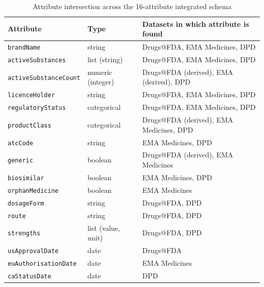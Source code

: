 \documentclass{llncs}
\begin{document}
\begin{table}[htbp]
\centering
\caption{Attribute intersection across the 16-attribute integrated schema}
\label{tab:schema}
\scriptsize
\setlength{\tabcolsep}{3pt}
\begin{tabularx}{\textwidth}{|l|l|>{\raggedright\arraybackslash}X|}
\hline
\textbf{Attribute} & \textbf{Type} & \textbf{Datasets in which attribute is found} \\
\hline
\texttt{brandName}            & string             & Drugs@FDA, EMA Medicines, DPD \\
\texttt{activeSubstances}     & list (string)      & Drugs@FDA, EMA Medicines, DPD \\
\texttt{activeSubstanceCount} & numeric (integer)  & Drugs@FDA (derived), EMA (derived), DPD \\
\texttt{licenceHolder}        & string             & Drugs@FDA, EMA Medicines, DPD \\
\texttt{regulatoryStatus}     & categorical        & Drugs@FDA, EMA Medicines, DPD \\
\texttt{productClass}         & categorical        & Drugs@FDA (derived), EMA Medicines, DPD \\
\texttt{atcCode}              & string             & EMA Medicines, DPD \\
\texttt{generic}              & boolean            & Drugs@FDA (derived), EMA Medicines \\
\texttt{biosimilar}           & boolean            & EMA Medicines, DPD \\
\texttt{orphanMedicine}       & boolean            & EMA Medicines \\
\texttt{dosageForm}           & string             & Drugs@FDA, DPD \\
\texttt{route}                & string             & Drugs@FDA, DPD \\
\texttt{strengths}            & list (value, unit) & Drugs@FDA, DPD \\
\texttt{usApprovalDate}       & date               & Drugs@FDA \\
\texttt{euAuthorisationDate}  & date               & EMA Medicines \\
\texttt{caStatusDate}         & date               & DPD \\
\hline
\end{tabularx}
\end{table}
\end{document}
